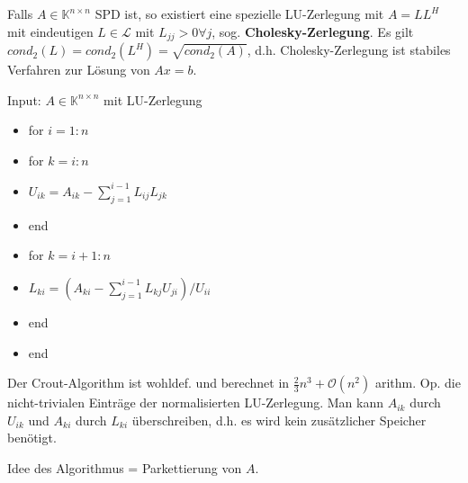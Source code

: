 \begin{remark}
	Falls $A \in \mathbb{K}^{n\times n}$ SPD ist, so existiert eine spezielle LU-Zerlegung mit $A=LL^H$ mit eindeutigen $L \in \mathcal{L}$ mit $L_{jj} > 0 \forall j$, sog. \textbf{Cholesky-Zerlegung}. Es gilt $cond_2(L) = cond_2(L^H) = \sqrt{cond_2(A)}$, d.h. Cholesky-Zerlegung ist stabiles Verfahren zur Lösung von $Ax=b$.
\end{remark}

\begin{algorithm}[Crout]
	Input: $A \in \mathbb{K}^{n\times n}$ mit LU-Zerlegung
	
	\begin{itemize}
		\item for $i=1:n$
		\item \hspace{0.5cm} for $k=i:n$
		\item \hspace{1cm} $U_{ik} = A_{ik} - \sum_{j=1}^{i-1} L_{ij}L_{jk}$
		\item \hspace{0.5cm} end
		\item \hspace{0.5cm} for $k = i+1:n$
		\item \hspace{1cm} $L_{ki} = \left(A_{ki} - \sum_{j=1}^{i-1} L_{kj} U_{ji}\right)/U_{ii}$
		\item \hspace{0.5cm} end
		\item end
	\end{itemize}
\end{algorithm}

\begin{theorem}
	Der Crout-Algorithm ist wohldef. und berechnet in $\frac{2}{3}n^3 + \mathcal{O}(n^2)$ arithm. Op. die nicht-trivialen Einträge der normalisierten LU-Zerlegung. Man kann $A_{ik}$ durch $U_{ik}$ und $A_{ki}$ durch $L_{ki}$ überschreiben, d.h. es wird kein zusätzlicher Speicher benötigt.
\end{theorem}

Idee des Algorithmus = Parkettierung von $A$.

